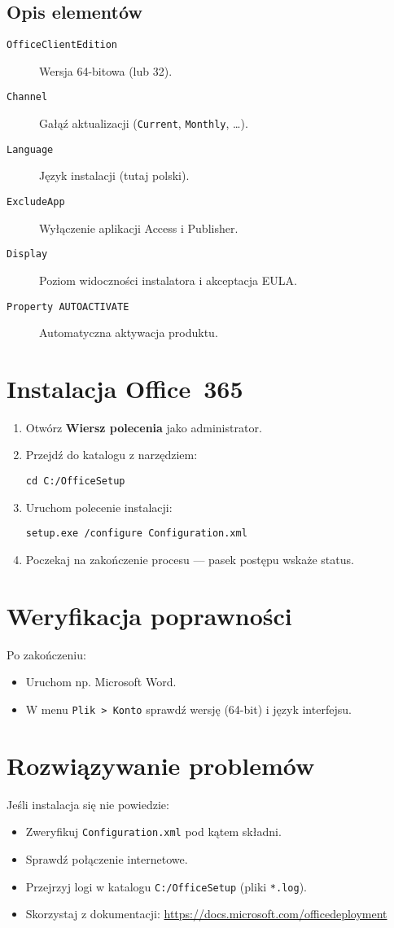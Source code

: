 \documentclass[a4paper,12pt]{article}
\begin{document}
\subsection{Opis elementów}
\begin{description}
  \item[\texttt{OfficeClientEdition}] Wersja 64-bitowa (lub 32).
  \item[\texttt{Channel}] Gałąź aktualizacji (\texttt{Current}, \texttt{Monthly}, \dots).
  \item[\texttt{Language}] Język instalacji (tutaj polski).
  \item[\texttt{ExcludeApp}] Wyłączenie aplikacji Access i Publisher.
  \item[\texttt{Display}] Poziom widoczności instalatora i akceptacja EULA.
  \item[\texttt{Property AUTOACTIVATE}] Automatyczna aktywacja produktu.
\end{description}

\section{Instalacja Office~365}
\begin{enumerate}
  \item Otwórz \textbf{Wiersz polecenia} jako administrator.
  \item Przejdź do katalogu z narzędziem:
    \begin{lstlisting}
cd C:/OfficeSetup
    \end{lstlisting}
  \item Uruchom polecenie instalacji:
    \begin{lstlisting}
setup.exe /configure Configuration.xml
    \end{lstlisting}
  \item Poczekaj na zakończenie procesu — pasek postępu wskaże status.
\end{enumerate}

\section{Weryfikacja poprawności}
Po zakończeniu:
\begin{itemize}
  \item Uruchom np. Microsoft Word.
  \item W menu \texttt{Plik > Konto} sprawdź wersję (64-bit) i język interfejsu.
\end{itemize}

\section{Rozwiązywanie problemów}
Jeśli instalacja się nie powiedzie:
\begin{itemize}
  \item Zweryfikuj \texttt{Configuration.xml} pod kątem składni.
  \item Sprawdź połączenie internetowe.
  \item Przejrzyj logi w katalogu \texttt{C:/OfficeSetup} (pliki \texttt{*.log}).
  \item Skorzystaj z dokumentacji: \url{https://docs.microsoft.com/officedeployment}
\end{itemize}
\end{document}

